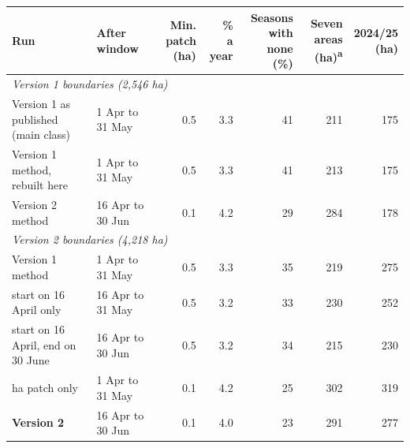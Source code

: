 \begin{tabular}{llrrrrr}
\toprule
Run & After window & \makecell[r]{Min.\\patch (ha)} & \makecell[r]{\%\\a year} & \makecell[r]{Seasons with\\none (\%)} & \makecell[r]{Seven\\areas (ha)\textsuperscript{a}} & \makecell[r]{2024/25\\(ha)} \\
\midrule
\multicolumn{7}{l}{\textit{Version 1 boundaries (2,546 ha)}} \\
Version 1 as published (main class) & 1 Apr to 31 May & 0.5 & 3.3 & 41 & 211 & 175 \\
Version 1 method, rebuilt here & 1 Apr to 31 May & 0.5 & 3.3 & 41 & 213 & 175 \\
Version 2 method & 16 Apr to 30 Jun & 0.1 & 4.2 & 29 & 284 & 178 \\
\midrule
\multicolumn{7}{l}{\textit{Version 2 boundaries (4,218 ha)}} \\
Version 1 method & 1 Apr to 31 May & 0.5 & 3.3 & 35 & 219 & 275 \\
\quad start on 16 April only & 16 Apr to 31 May & 0.5 & 3.2 & 33 & 230 & 252 \\
\quad start on 16 April, end on 30 June & 16 Apr to 30 Jun & 0.5 & 3.2 & 34 & 215 & 230 \\
\quad 0.1 ha patch only & 1 Apr to 31 May & 0.1 & 4.2 & 25 & 302 & 319 \\
\textbf{Version 2} & 16 Apr to 30 Jun & 0.1 & 4.0 & 23 & 291 & 277 \\
\bottomrule
\end{tabular}
